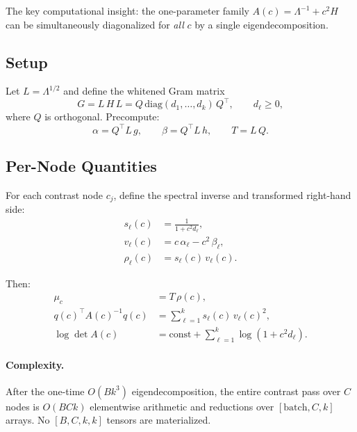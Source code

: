 \documentclass[11pt]{article}
\newcommand{\diag}{\mathrm{diag}}
\begin{document}
The key computational insight: the one-parameter family
$A(c) = \Lambda^{-1} + c^2 H$ can be simultaneously diagonalized for
\emph{all} $c$ by a single eigendecomposition.

\subsection{Setup}

Let $L = \Lambda^{1/2}$ and define the whitened Gram matrix
\begin{equation}
  G = L\, H\, L = Q\, \diag(d_1, \dots, d_k)\, Q^\top,
  \qquad d_\ell \geq 0,
\end{equation}
where $Q$ is orthogonal.  Precompute:
\begin{equation}
  \alpha = Q^\top L\, g, \qquad
  \beta = Q^\top L\, h, \qquad
  T = L\, Q.
\end{equation}

\subsection{Per-Node Quantities}

For each contrast node $c_j$, define the spectral inverse and
transformed right-hand side:
\begin{align}
  s_\ell(c) &= \frac{1}{1 + c^2 d_\ell}, \label{eq:s} \\
  v_\ell(c) &= c\,\alpha_\ell - c^2\,\beta_\ell, \label{eq:v} \\
  \rho_\ell(c) &= s_\ell(c)\, v_\ell(c). \label{eq:rho}
\end{align}

Then:
\begin{align}
  \mu_c &= T\, \rho(c), \label{eq:mu-spectral} \\
  q(c)^\top A(c)^{-1} q(c) &= \sum_{\ell=1}^k s_\ell(c)\, v_\ell(c)^2,
  \label{eq:quad-spectral} \\
  \log\det A(c) &= \text{const} + \sum_{\ell=1}^k \log(1 + c^2 d_\ell).
  \label{eq:logdet-spectral}
\end{align}

\paragraph{Complexity.}
After the one-time $O(Bk^3)$ eigendecomposition, the entire contrast
pass over $C$ nodes is $O(BCk)$ elementwise arithmetic and reductions
over $[\text{batch}, C, k]$ arrays.  No $[B, C, k, k]$ tensors are
materialized.
\end{document}
